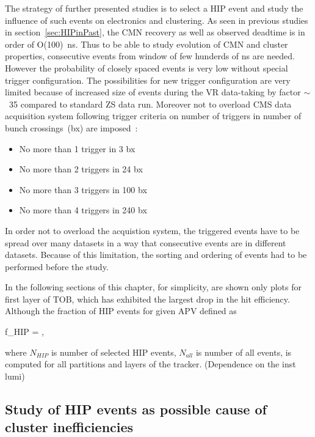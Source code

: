 The strategy of further presented studies is to select a HIP event and study the influence of such events on electronics and clustering. As seen in previous studies in section~\ref{sec:HIPinPast}, the CMN recovery as well as observed deadtime is in order of O(100)~ns. Thus to be able to study evolution of CMN and cluster properties, consecutive events from window of few hunderds of ns are needed. However the probability of closely spaced events is very low without special trigger configuration. The possibilities for new trigger configuration are very limited because of increased size of events during the VR data-taking by factor $\sim$~35 compared to standard ZS data run. Moreover not to overload CMS data acquisition system following trigger criteria on number of triggers in number of bunch crossings~(bx) are  imposed~\cite{website:VRtrigger}:

\begin{itemize}
\item{No more than 1 trigger in 3 bx}
\item{No more than 2 triggers in 24 bx}
\item{No more than 3 triggers in 100 bx}
\item{No more than 4 triggers in 240 bx}
\end{itemize}

In order not to overload the acquistion system, the triggered events have to be spread over many datasets in a way that consecutive events are in different datasets. Because of this limitation, the sorting and ordering of events had to be performed before the study.

In the following sections of this chapter, for simplicity, are shown only plots for first layer of TOB, which has exhibited the largest drop in the hit efficiency. Although the fraction of HIP events for given APV defined as


{
f_{HIP} = ,
}

where $N_{HIP}$ is number of selected HIP events, $N_{all}$ is number of all events, is computed for all partitions and layers of the tracker. (Dependence on the inst lumi)


\subsection{Study of HIP events as possible cause of cluster inefficiencies~\label{sec:firstStudy}}

